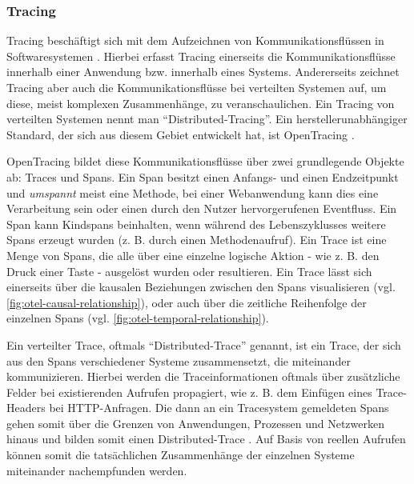 \subsubsection{Tracing}
\label{sec:tracing}

Tracing beschäftigt sich mit dem Aufzeichnen von Kommunikationsflüssen in Softwaresystemen \cite{TowardsPerformanceToolingInteroperability}. Hierbei erfasst Tracing einerseits die Kommunikationsflüsse innerhalb einer Anwendung bzw. innerhalb eines Systems. Andererseits zeichnet Tracing aber auch die Kommunikationsflüsse bei verteilten Systemen auf, um diese, meist komplexen Zusammenhänge, zu veranschaulichen. Ein Tracing von verteilten Systemen nennt man \enquote{Distributed-Tracing}. Ein herstellerunabhängiger Standard, der sich aus diesem Gebiet entwickelt hat, ist OpenTracing \cite{OpenTracing}.

OpenTracing bildet diese Kommunikationsflüsse über zwei grundlegende Objekte ab: Traces und Spans. Ein Span besitzt einen Anfangs- und einen Endzeitpunkt und \textit{umspannt} meist eine Methode, bei einer Webanwendung kann dies eine Verarbeitung sein oder einen durch den Nutzer hervorgerufenen Eventfluss. Ein Span kann Kindspans beinhalten, wenn während des Lebenszyklusses weitere Spans erzeugt wurden (z. B. durch einen Methodenaufruf). Ein Trace ist eine Menge von Spans, die alle über eine einzelne logische Aktion - wie z. B. den Druck einer Taste - ausgelöst wurden oder resultieren. Ein Trace lässt sich einerseits über die kausalen Beziehungen zwischen den Spans visualisieren (vgl. \autoref{fig:otel-causal-relationship}), oder auch über die zeitliche Reihenfolge der einzelnen Spans (vgl. \autoref{fig:otel-temporal-relationship}).

Ein verteilter Trace, oftmals \enquote{Distributed-Trace} genannt, ist ein Trace, der sich aus den Spans verschiedener Systeme zusammensetzt, die miteinander kommunizieren. Hierbei werden die Traceinformationen oftmals über zusätzliche Felder bei existierenden Aufrufen propagiert, wie z. B. dem Einfügen eines Trace-Headers bei HTTP-Anfragen. Die dann an ein Tracesystem gemeldeten Spans gehen somit über die Grenzen von Anwendungen, Prozessen und Netzwerken hinaus und bilden somit einen Distributed-Trace \cite{OpenTracingSpecification}. Auf Basis von reellen Aufrufen können somit die tatsächlichen Zusammenhänge der einzelnen Systeme miteinander nachempfunden werden.

